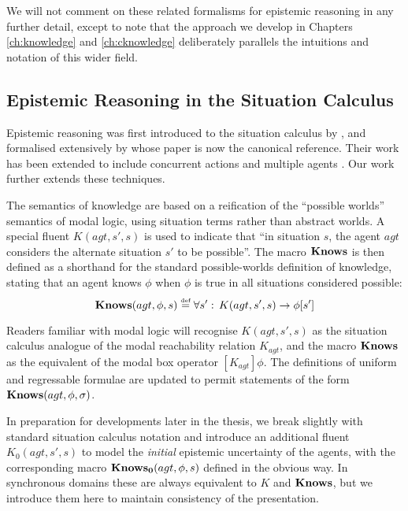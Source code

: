 We will not comment on these related formalisms for epistemic reasoning
in any further detail, except to note that the approach we develop
in Chapters \ref{ch:knowledge} and \ref{ch:cknowledge} deliberately
parallels the intuitions and notation of this wider field.


\subsection{Epistemic Reasoning in the Situation Calculus}

Epistemic reasoning was first introduced to the situation calculus
by \citet{moore80know_act}, and formalised extensively by \citet{scherl03sc_knowledge}
whose paper is now the canonical reference. Their work has been extended
to include concurrent actions \citep{scherl03conc_knowledge} and
multiple agents \citep{shapiro98specifying_ma_systems}. Our work
further extends these techniques.

The semantics of knowledge are based on a reification of the {}``possible
worlds'' semantics of modal logic, using situation terms rather than
abstract worlds. A special fluent $K(agt,s',s)$ is used to indicate
that {}``in situation $s$, the agent $agt$ considers the alternate
situation $s'$ to be possible''. The macro $\mathbf{Knows}$ is then defined
as a shorthand for the standard possible-worlds definition of knowledge,
stating that an agent knows $\phi$ when $\phi$ is true in all situations
considered possible: \begin{equation}
\mathbf{Knows}(agt,\phi,s)\stackrel{\mbox{\tiny def}}{=}\forall s':\, K(agt,s',s)\rightarrow\phi[s']\label{eqn:Knowledge:knows_def}\end{equation}


Readers familiar with modal logic will recognise $K(agt,s',s)$ as
the situation calculus analogue of the modal reachability relation
$K_{agt}$, and the macro $\mathbf{Knows}$ as the equivalent of the modal
box operator $[K_{agt}]\phi$. The definitions of uniform and regressable
formulae are updated to permit statements of the form $\mathbf{Knows}(agt,\phi,\sigma)$.

In preparation for developments later in the thesis, we break slightly
with standard situation calculus notation and introduce an additional
fluent $K_{0}(agt,s',s)$ to model the \emph{initial} epistemic uncertainty
of the agents, with the corresponding macro $\mathbf{Knows_{0}}(agt,\phi,s)$
defined in the obvious way. In synchronous domains these are always
equivalent to $K$ and $\mathbf{Knows}$, but we introduce them here to maintain
consistency of the presentation.

